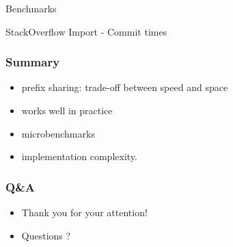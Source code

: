 \documentclass{beamer}
\begin{document}
\begin{section}{Benchmarks}
    \begin{frame}{StackOverflow Import - Commit times}
      \begin{figure}
      \centering
    \end{figure}
    \end{frame}
  \end{section}

  \begin{frame}
    \frametitle{Summary}
      \begin{itemize}
        \item prefix sharing: trade-off between speed and space
        \item works well in practice
        \item microbenchmarks
        \item implementation complexity.
      \end{itemize}
  \end{frame}

  \begin{frame}
    \frametitle{Q\&A}
      \begin{itemize}
        \item Thank you for your attention!
        \item Questions ?
      \end{itemize}
  \end{frame}
\end{document}
